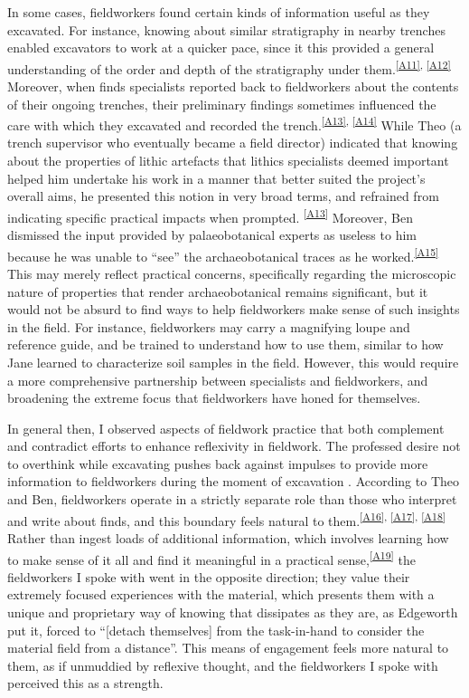 In some cases, fieldworkers found certain kinds of information useful as they excavated.
For instance, knowing about similar stratigraphy in nearby trenches enabled excavators to work at a quicker pace, since it this provided a general understanding of the order and depth of the stratigraphy under them.\textsuperscript{\ref{A11}, \ref{A12}}
Moreover, when finds specialists reported back to fieldworkers about the contents of their ongoing trenches, their preliminary findings sometimes influenced the care with which they excavated and recorded the trench.\textsuperscript{\ref{A13}, \ref{A14}}
While Theo (a trench supervisor who eventually became a field director) indicated that knowing about the properties of lithic artefacts that lithics specialists deemed important helped him undertake his work in a manner that better suited the project's overall aims, he presented this notion in very broad terms, and refrained from indicating specific practical impacts when prompted. \textsuperscript{\ref{A13}}
Moreover, Ben dismissed the input provided by palaeobotanical experts as useless to him because he was unable to ``see'' the archaeobotanical traces as he worked.\textsuperscript{\ref{A15}}
This may merely reflect practical concerns, specifically regarding the microscopic nature of properties that render archaeobotanical remains significant, but it would not be absurd to find ways to help fieldworkers make sense of such insights in the field.
For instance, fieldworkers may carry a magnifying loupe and reference guide, and be trained to understand how to use them, similar to how Jane learned to characterize soil samples in the field.
However, this would require a more comprehensive partnership between specialists and fieldworkers, and broadening the extreme focus that fieldworkers have honed for themselves.

In general then, I observed aspects of fieldwork practice that both complement and contradict efforts to enhance reflexivity in fieldwork.
The professed desire not to overthink while excavating pushes back against impulses to provide more information to fieldworkers during the moment of excavation \parencites(cf.)()[]{berggren2012}[]{berggren2015}.
According to Theo and Ben, fieldworkers operate in a strictly separate role than those who interpret and write about finds, and this boundary feels natural to them.\textsuperscript{\ref{A16}, \ref{A17}, \ref{A18}}
Rather than ingest loads of additional information, which involves learning how to make sense of it all and find it meaningful in a practical sense,\textsuperscript{\ref{A19}} the fieldworkers I spoke with went in the opposite direction; they value their extremely focused experiences with the material, which presents them with a unique and proprietary way of knowing that dissipates as they are, as Edgeworth \parencite*[109]{edgeworth2003} put it, forced to ``[detach themselves] from the task-in-hand to consider the material field from a distance''.
This means of engagement feels more natural to them, as if unmuddied by reflexive thought, and the fieldworkers I spoke with perceived this as a strength.

